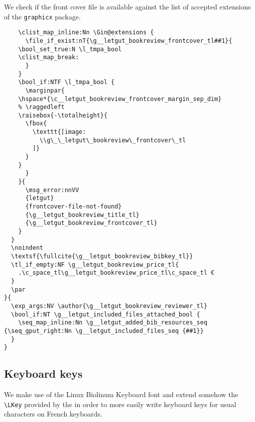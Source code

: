 \documentclass{letgut}
\begin{document}
We check if the front cover file is available against the list of accepted
extensions of the \lstinline+graphicx+ package.

\begin{lstlisting}
    \clist_map_inline:Nn \Gin@extensions {
      \file_if_exist:nT{\g__letgut_bookreview_frontcover_tl##1}{
	\bool_set_true:N \l_tmpa_bool
	\clist_map_break:
      }
    }
    \bool_if:NTF \l_tmpa_bool {
      \marginpar{
	\hspace*{\c__letgut_bookreview_frontcover_margin_sep_dim}
	% \raggedleft
	\raisebox{-\totalheight}{
	  \fbox{
	    \texttt{[image: 
	      \\g\_\_letgut\_bookreview\_frontcover\_tl
	    ]}
	  }
	}
      }
    }{
      \msg_error:nnVV
      {letgut}
      {frontcover-file-not-found}
      {\g__letgut_bookreview_title_tl}
      {\g__letgut_bookreview_frontcover_tl}
    }
  }
  \noindent
  \textsf{\fullcite{\g__letgut_bookreview_bibkey_tl}}
  \tl_if_empty:NF \g__letgut_bookreview_price_tl{
    .\c_space_tl\g__letgut_bookreview_price_tl\c_space_tl €
  }
  \par
}{
  \exp_args:NV \author{\g__letgut_bookreview_reviewer_tl}
  \bool_if:NT \g__letgut_included_files_attached_bool {
    \seq_map_inline:Nn \g__letgut_added_bib_resources_seq {\seq_gput_right:Nn \g__letgut_included_files_seq {##1}}
  }
}
\end{lstlisting}

\subsection{Keyboard keys}
\label{ImplementationKeyboardkeys-qa0h55h0jlj0}
We make use of the Linux Biolinum Keyboard font and extend somehow the \lstinline+\LKey+
provided by the  in order to more easily write keyboard keys
for usual characters on French keyboards.
\end{document}
